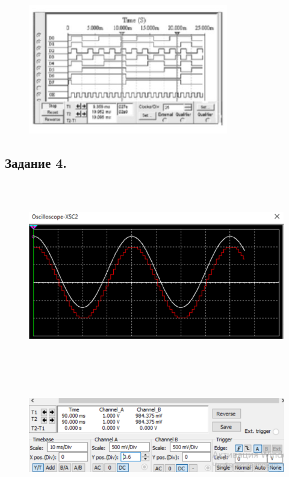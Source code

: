 \documentclass[spec, och, labwork]{shiza}
\begin{document}
\begin{figure}[H]
    \centering
    \includegraphics[width=3.42708in,height=2.21875in]{image7.png}
\end{figure}

\subsection*{Задание 4.}

\begin{figure}[H]
    \centering
    \includegraphics[width=6.49653in,height=3.21944in]{image8.png}
\end{figure}

\begin{figure}[H]
    \centering
    \includegraphics[width=4.63333in,height=1.89653in]{image9.png}
\end{figure}
\end{document}
